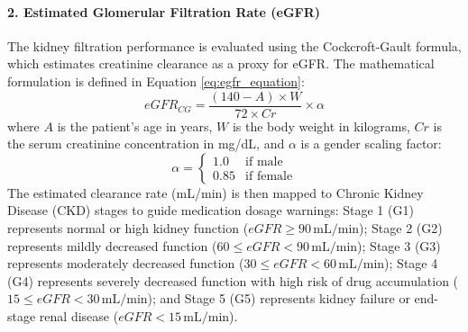 \documentclass[../main.tex]{subfiles}
\begin{document}
\paragraph{2. Estimated Glomerular Filtration Rate (eGFR)}
The kidney filtration performance is evaluated using the Cockcroft-Gault formula, which estimates creatinine clearance as a proxy for eGFR. The mathematical formulation is defined in Equation \eqref{eq:egfr_equation}:
\begin{equation}\label{eq:egfr_equation}
eGFR_{CG} = \frac{(140 - A) \times W}{72 \times Cr} \times \alpha
\end{equation}
where $A$ is the patient's age in years, $W$ is the body weight in kilograms, $Cr$ is the serum creatinine concentration in mg/dL, and $\alpha$ is a gender scaling factor:
\begin{equation}\label{eq:egfr_gender_factor}
\alpha = \begin{cases}
1.0 & \text{if male} \\
0.85 & \text{if female}
\end{cases}
\end{equation}
The estimated clearance rate (mL/min) is then mapped to Chronic Kidney Disease (CKD) stages to guide medication dosage warnings: Stage 1 (G1) represents normal or high kidney function ($eGFR \ge 90\,\text{mL/min}$); Stage 2 (G2) represents mildly decreased function ($60 \le eGFR < 90\,\text{mL/min}$); Stage 3 (G3) represents moderately decreased function ($30 \le eGFR < 60\,\text{mL/min}$); Stage 4 (G4) represents severely decreased function with high risk of drug accumulation ($15 \le eGFR < 30\,\text{mL/min}$); and Stage 5 (G5) represents kidney failure or end-stage renal disease ($eGFR < 15\,\text{mL/min}$).
\end{document}
